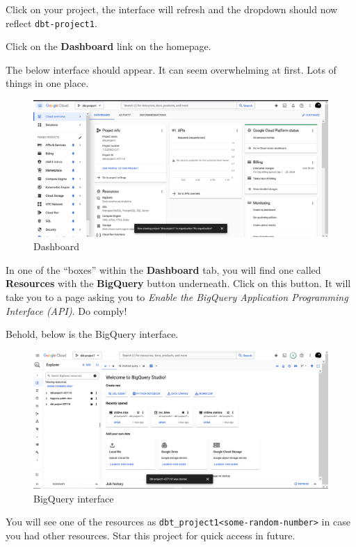\documentclass[
]{book}
\begin{document}
Click on your project, the interface will refresh and the dropdown should now reflect \texttt{dbt-project1}.

Click on the \textbf{Dashboard} link on the homepage.

The below interface should appear. It can seem overwhelming at first. Lots of things in one place.

\begin{figure}
\centering
\includegraphics{./images/dashboard.png}
\caption{Dashboard}
\end{figure}

In one of the ``boxes'' within the \textbf{Dashboard} tab, you will find one called \textbf{Resources} with the \textbf{BigQuery} button underneath. Click on this button. It will take you to a page asking you to \emph{Enable the BigQuery Application Programming Interface (API)}. Do comply!

Behold, below is the BigQuery interface.

\begin{figure}
\centering
\includegraphics{./images/bigquery_interface.png}
\caption{BigQuery interface}
\end{figure}

You will see one of the resources as \texttt{dbt\_project1\textless{}some-random-number\textgreater{}} in case you had other resources. Star this project for quick access in future.
\end{document}
